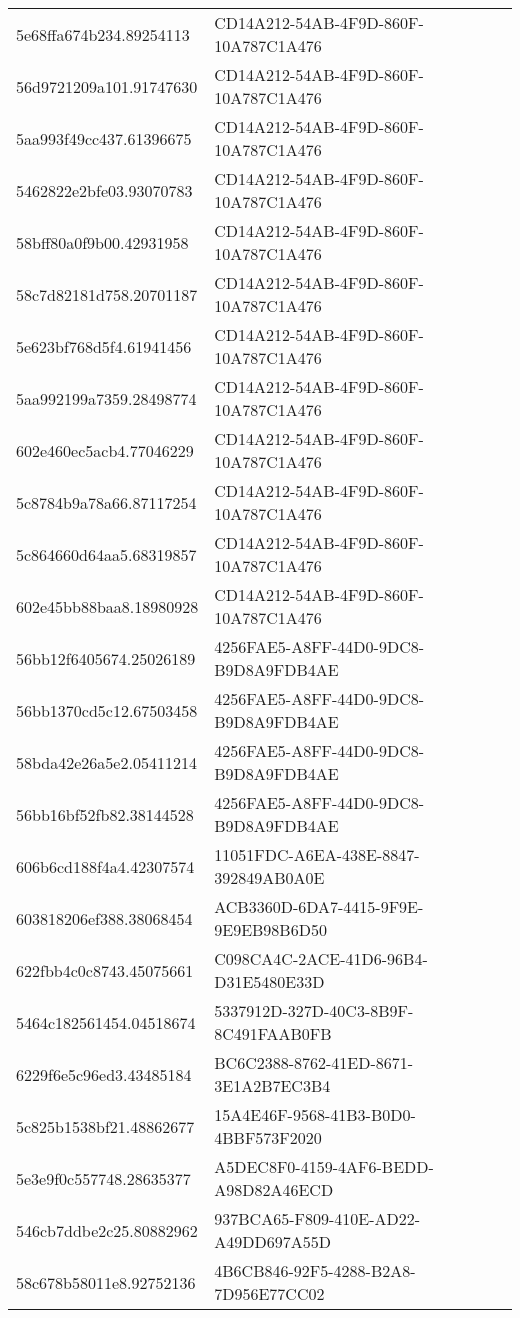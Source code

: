 \begin{tabular}{ll}
5e68ffa674b234.89254113 & CD14A212-54AB-4F9D-860F-10A787C1A476 \\
56d9721209a101.91747630 & CD14A212-54AB-4F9D-860F-10A787C1A476 \\
5aa993f49cc437.61396675 & CD14A212-54AB-4F9D-860F-10A787C1A476 \\
5462822e2bfe03.93070783 & CD14A212-54AB-4F9D-860F-10A787C1A476 \\
58bff80a0f9b00.42931958 & CD14A212-54AB-4F9D-860F-10A787C1A476 \\
58c7d82181d758.20701187 & CD14A212-54AB-4F9D-860F-10A787C1A476 \\
5e623bf768d5f4.61941456 & CD14A212-54AB-4F9D-860F-10A787C1A476 \\
5aa992199a7359.28498774 & CD14A212-54AB-4F9D-860F-10A787C1A476 \\
602e460ec5acb4.77046229 & CD14A212-54AB-4F9D-860F-10A787C1A476 \\
5c8784b9a78a66.87117254 & CD14A212-54AB-4F9D-860F-10A787C1A476 \\
5c864660d64aa5.68319857 & CD14A212-54AB-4F9D-860F-10A787C1A476 \\
602e45bb88baa8.18980928 & CD14A212-54AB-4F9D-860F-10A787C1A476 \\
56bb12f6405674.25026189 & 4256FAE5-A8FF-44D0-9DC8-B9D8A9FDB4AE \\
56bb1370cd5c12.67503458 & 4256FAE5-A8FF-44D0-9DC8-B9D8A9FDB4AE \\
58bda42e26a5e2.05411214 & 4256FAE5-A8FF-44D0-9DC8-B9D8A9FDB4AE \\
56bb16bf52fb82.38144528 & 4256FAE5-A8FF-44D0-9DC8-B9D8A9FDB4AE \\
606b6cd188f4a4.42307574 & 11051FDC-A6EA-438E-8847-392849AB0A0E \\
603818206ef388.38068454 & ACB3360D-6DA7-4415-9F9E-9E9EB98B6D50 \\
622fbb4c0c8743.45075661 & C098CA4C-2ACE-41D6-96B4-D31E5480E33D \\
5464c182561454.04518674 & 5337912D-327D-40C3-8B9F-8C491FAAB0FB \\
6229f6e5c96ed3.43485184 & BC6C2388-8762-41ED-8671-3E1A2B7EC3B4 \\
5c825b1538bf21.48862677 & 15A4E46F-9568-41B3-B0D0-4BBF573F2020 \\
5e3e9f0c557748.28635377 & A5DEC8F0-4159-4AF6-BEDD-A98D82A46ECD \\
546cb7ddbe2c25.80882962 & 937BCA65-F809-410E-AD22-A49DD697A55D \\
58c678b58011e8.92752136 & 4B6CB846-92F5-4288-B2A8-7D956E77CC02 \\

\end{tabular}
